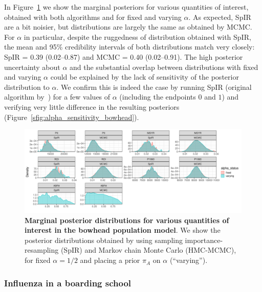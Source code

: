 \documentclass[a4paper, notitlepage, 11pt]{article}
\begin{document}
In Figure~\ref{fig:bowhead_marginal_posteriors} we show the marginal posteriors for various quantities of interest, obtained with both algorithms and for fixed and varying $\alpha$.
As expected, SpIR are a bit noisier, but distributions are largely the same as obtained by MCMC.
For $\alpha$ in particular, despite the ruggedness of distribution obtained with SpIR, the mean and 95\% credibility intervals of both distributions match very closely: SpIR = 0.39 (0.02--0.87) and MCMC = 0.40 (0.02--0.91).
The high posterior uncertainty about $\alpha$ and the substantial overlap between distributions with fixed and varying $\alpha$ could be explained by the lack of sensitivity of the posterior distribution to $\alpha$.
We confirm this is indeed the case by running SpIR (original algorithm by~\cite{Poole2000}) for a few values of $\alpha$ (including the endpoints $0$ and $1$) and verifying very little difference in the resulting posteriors (Figure~\ref{sfig:alpha_sensitivity_bowhead}). 
\begin{figure}[!ht]
\begin{center}
\includegraphics[scale=.45]{../plots/bowhead_posteriors.pdf}
\end{center}
\caption{\textbf{Marginal posterior distributions for various quantities of interest in the bowhead population model}.
We show the posterior distributions obtained by using sampling importance-resampling (SpIR) and Markov chain Monte Carlo (HMC-MCMC), for fixed $\alpha = 1/2$ and placing a prior $\pi_A$ on $\alpha$ (``varying'').
}
\label{fig:bowhead_marginal_posteriors}
\end{figure}

\subsubsection{Influenza in a boarding school}
\label{sec:SIR_flu}
\end{document}
